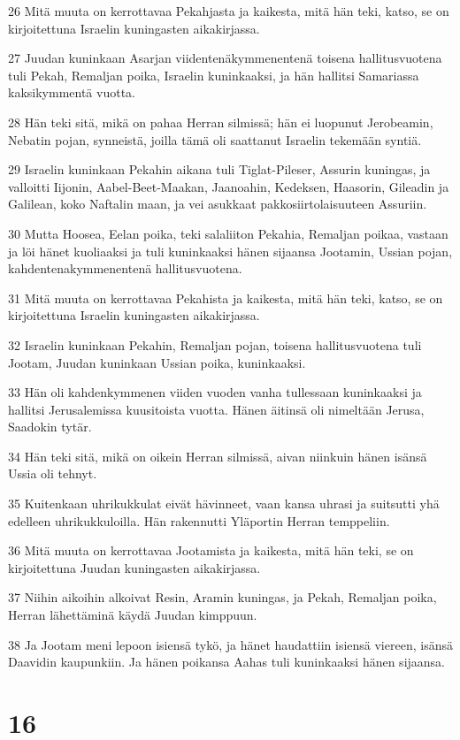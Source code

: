 \par 26 Mitä muuta on kerrottavaa Pekahjasta ja kaikesta, mitä hän teki, katso, se on kirjoitettuna Israelin kuningasten aikakirjassa.
\par 27 Juudan kuninkaan Asarjan viidentenäkymmenentenä toisena hallitusvuotena tuli Pekah, Remaljan poika, Israelin kuninkaaksi, ja hän hallitsi Samariassa kaksikymmentä vuotta.
\par 28 Hän teki sitä, mikä on pahaa Herran silmissä; hän ei luopunut Jerobeamin, Nebatin pojan, synneistä, joilla tämä oli saattanut Israelin tekemään syntiä.
\par 29 Israelin kuninkaan Pekahin aikana tuli Tiglat-Pileser, Assurin kuningas, ja valloitti Iijonin, Aabel-Beet-Maakan, Jaanoahin, Kedeksen, Haasorin, Gileadin ja Galilean, koko Naftalin maan, ja vei asukkaat pakkosiirtolaisuuteen Assuriin.
\par 30 Mutta Hoosea, Eelan poika, teki salaliiton Pekahia, Remaljan poikaa, vastaan ja löi hänet kuoliaaksi ja tuli kuninkaaksi hänen sijaansa Jootamin, Ussian pojan, kahdentenakymmenentenä hallitusvuotena.
\par 31 Mitä muuta on kerrottavaa Pekahista ja kaikesta, mitä hän teki, katso, se on kirjoitettuna Israelin kuningasten aikakirjassa.
\par 32 Israelin kuninkaan Pekahin, Remaljan pojan, toisena hallitusvuotena tuli Jootam, Juudan kuninkaan Ussian poika, kuninkaaksi.
\par 33 Hän oli kahdenkymmenen viiden vuoden vanha tullessaan kuninkaaksi ja hallitsi Jerusalemissa kuusitoista vuotta. Hänen äitinsä oli nimeltään Jerusa, Saadokin tytär.
\par 34 Hän teki sitä, mikä on oikein Herran silmissä, aivan niinkuin hänen isänsä Ussia oli tehnyt.
\par 35 Kuitenkaan uhrikukkulat eivät hävinneet, vaan kansa uhrasi ja suitsutti yhä edelleen uhrikukkuloilla. Hän rakennutti Yläportin Herran temppeliin.
\par 36 Mitä muuta on kerrottavaa Jootamista ja kaikesta, mitä hän teki, se on kirjoitettuna Juudan kuningasten aikakirjassa.
\par 37 Niihin aikoihin alkoivat Resin, Aramin kuningas, ja Pekah, Remaljan poika, Herran lähettäminä käydä Juudan kimppuun.
\par 38 Ja Jootam meni lepoon isiensä tykö, ja hänet haudattiin isiensä viereen, isänsä Daavidin kaupunkiin. Ja hänen poikansa Aahas tuli kuninkaaksi hänen sijaansa.

\chapter{16}

